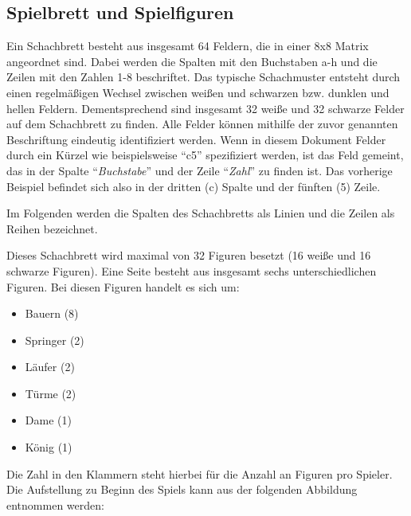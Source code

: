 \documentclass[12pt]{article}
\providecommand{\tightlist}{%
      \setlength{\itemsep}{0pt}\setlength{\parskip}{0pt}}
\begin{document}
    \hypertarget{spielbrett-und-spielfiguren}{%
\subsection{Spielbrett und
Spielfiguren}\label{spielbrett-und-spielfiguren}}

Ein Schachbrett besteht aus insgesamt 64 Feldern, die in einer 8x8
Matrix angeordnet sind. Dabei werden die Spalten mit den Buchstaben a-h
und die Zeilen mit den Zahlen 1-8 beschriftet. Das typische Schachmuster
entsteht durch einen regelmäßigen Wechsel zwischen weißen und schwarzen
bzw. dunklen und hellen Feldern. Dementsprechend sind insgesamt 32 weiße
und 32 schwarze Felder auf dem Schachbrett zu finden. Alle Felder können
mithilfe der zuvor genannten Beschriftung eindeutig identifiziert
werden. Wenn in diesem Dokument Felder durch ein Kürzel wie
beispielsweise ``c5'' spezifiziert werden, ist das Feld gemeint, das in
der Spalte ``\emph{Buchstabe}'' und der Zeile ``\emph{Zahl}'' zu finden
ist. Das vorherige Beispiel befindet sich also in der dritten (c) Spalte
und der fünften (5) Zeile.

Im Folgenden werden die Spalten des Schachbretts als Linien und die
Zeilen als Reihen bezeichnet.

Dieses Schachbrett wird maximal von 32 Figuren besetzt (16 weiße und 16
schwarze Figuren). Eine Seite besteht aus insgesamt sechs
unterschiedlichen Figuren. Bei diesen Figuren handelt es sich um:

\begin{itemize}
\tightlist
\item
  Bauern (8)
\item
  Springer (2)
\item
  Läufer (2)
\item
  Türme (2)
\item
  Dame (1)
\item
  König (1)
\end{itemize}

Die Zahl in den Klammern steht hierbei für die Anzahl an Figuren pro
Spieler. Die Aufstellung zu Beginn des Spiels kann aus der folgenden
Abbildung entnommen werden:
\end{document}
